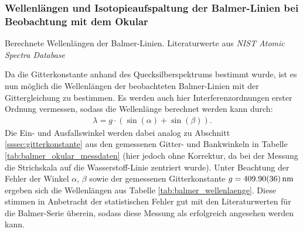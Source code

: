 \documentclass[11pt, a4paper]{article}
\numberwithin{equation}{section}
\begin{document}
\subsubsection{Wellenlängen und Isotopieaufspaltung der Balmer-Linien bei Beobachtung mit dem Okular}
\label{sssec:balmer_okular_aufspaltung}
\begin{table}[h]
	\centering
	
	\caption{Berechnete Wellenlängen der Balmer-Linien. Literaturwerte aus \emph{NIST Atomic Spectra Database} \cite{NISTSpectra}}
	\label{tab:balmer_wellenlaenge}
\end{table}
Da die Gitterkonstante anhand des Quecksilberspektrums bestimmt wurde, ist es nun möglich die Wellenlängen der beobachteten Balmer-Linien mit der Gittergleichung zu bestimmen.
Es werden auch hier Interferenzordnungen erster Ordnung vermessen, sodass die Wellenlänge berechnet werden kann durch:
\begin{align*}
  \lambda = g \cdot ( \sin(\alpha) + \sin(\beta)) \text{.}
\end{align*}
Die Ein- und Ausfallswinkel werden dabei analog zu Abschnitt \ref{sssec:gitterkonstante} aus den gemessenen Gitter- und Bankwinkeln in Tabelle \ref{tab:balmer_okular_messdaten} (hier jedoch ohne Korrektur, da bei der Messung die Strichskala auf die Wasserstoff-Linie zentriert wurde).
Unter Beachtung der Fehler der Winkel $\alpha$, $\beta$ sowie der gemessenen Gitterkonstante $g = \SI{409.90 +- 0.36}{\nano\metre}$ ergeben sich die Wellenlängen aus Tabelle \ref{tab:balmer_wellenlaenge}.
Diese stimmen in Anbetracht der statistischen Fehler gut mit den Literaturwerten für die Balmer-Serie überein, sodass diese Messung als erfolgreich angesehen werden kann.
\end{document}
